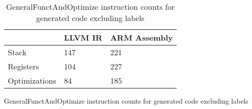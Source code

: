\begin{table}[h!]
\centering
\begin{tabular}{p{}p{}p{}}
  \hline
 & LLVM IR & ARM Assembly \\ 
  \hline
Stack & 147 & 221 \\ 
  Registers & 104 & 227 \\ 
  Optimizations &  84 & 185 \\ 
   \hline
\end{tabular}
\caption{GeneralFunctAndOptimize instruction counts for generated code excluding labels}
\caption{GeneralFunctAndOptimize instruction counts for generated code excluding labels}
\end{table}
